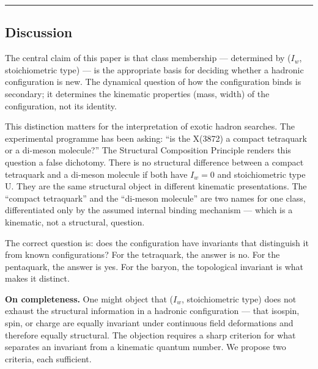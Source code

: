 \documentclass[12pt,a4paper]{article}
\begin{document}
\begin{center}\rule{0.5\linewidth}{0.5pt}\end{center}

\hypertarget{discussion}{%
\subsection{Discussion}\label{discussion}}

The central claim of this paper is that class membership ---
determined by (\(I_w\), stoichiometric type) --- is the appropriate
basis for deciding whether a hadronic configuration is new. The
dynamical question of how the configuration binds is secondary; it
determines the kinematic properties (mass, width) of the configuration,
not its identity.

This distinction matters for the interpretation of exotic hadron
searches. The experimental programme has been asking: ``is the X(3872) a
compact tetraquark or a di-meson molecule?'' The Structural Composition
Principle renders this question a false dichotomy. There is no
structural difference between a compact tetraquark and a di-meson
molecule if both have \(I_w = 0\) and stoichiometric type U. They are
the same structural object in different kinematic presentations. The
``compact tetraquark'' and the ``di-meson molecule'' are two names for
one class, differentiated only by the assumed internal
binding mechanism --- which is a kinematic, not a structural, question.

The correct question is: does the configuration have invariants that distinguish it from known configurations? For the
tetraquark, the answer is no. For the pentaquark, the answer is yes. For
the baryon, the topological invariant is what makes it distinct.

\textbf{On completeness.} One might object that (\(I_w\), stoichiometric
type) does not exhaust the structural information in a hadronic
configuration --- that isospin, spin, or charge are equally invariant
under continuous field deformations and therefore equally structural.
The objection requires a sharp criterion for what separates an invariant from a kinematic quantum number. We propose two criteria, each
sufficient.
\end{document}
